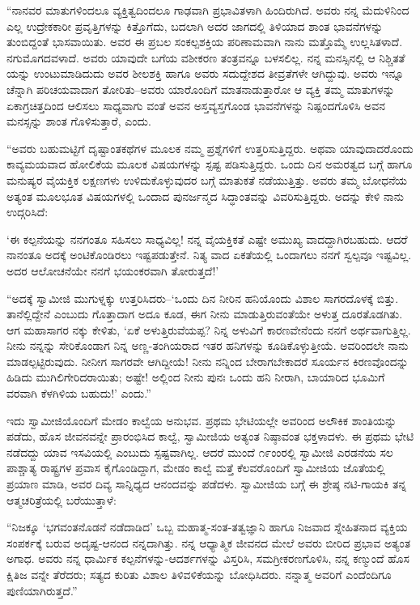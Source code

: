 “ನಾನವರ ಮಾತುಗಳಿಂದಲೂ ವ್ಯಕ್ತಿತ್ವದಿಂದಲೂ ಗಾಢವಾಗಿ ಪ್ರಭಾವಿತಳಾಗಿ ಹಿಂದಿರುಗಿದೆ. ಅವರು ನನ್ನ ಮೆದುಳಿನಿಂದ ಎಲ್ಲ ಉದ್ರೇಕಕಾರೀ ಪ್ರವೃತ್ತಿಗಳನ್ನು ಕಿತ್ತೊಗೆದು, ಬದಲಾಗಿ ಅದರ ಜಾಗದಲ್ಲಿ ತಿಳಿಯಾದ ಶಾಂತ ಭಾವನೆಗಳನ್ನು ತುಂಬಿದ್ದಂತೆ ಭಾಸವಾಯಿತು. ಅವರ ಈ ಪ್ರಬಲ ಸಂಕಲ್ಪಶಕ್ತಿಯ ಪರಿಣಾಮವಾಗಿ ನಾನು ಮತ್ತೊಮ್ಮೆ ಉಲ್ಲಸಿತಳಾದೆ. ನಗುಮೊಗದವಳಾದೆ. ಅವರು ಯಾವುದೇ ಬಗೆಯ ವಶೀಕರಣ ತಂತ್ರವನ್ನೂ ಬಳಸಲಿಲ್ಲ. ನನ್ನ ಮನಸ್ಸಿನಲ್ಲಿ ಆ ನಿಶ್ಚಿತತೆ ಯನ್ನು ಉಂಟುಮಾಡಿದುದು ಅವರ ಶೀಲಶಕ್ತಿ ಹಾಗೂ ಅವರು ಸದುದ್ದೇಶದ ತೀವ್ರತೆಗಳೇ ಆಗಿದ್ದುವು. ಅವರು ಇನ್ನೂ ಚೆನ್ನಾಗಿ ಪರಿಚಯವಾದಾಗ ತೋರಿತು–ಅವರು ಯಾರೊಂದಿಗೆ ಮಾತನಾಡುತ್ತಾರೋ ಆ ವ್ಯಕ್ತಿ ತಮ್ಮ ಮಾತುಗಳನ್ನು ಏಕಾಗ್ರಚಿತ್ತದಿಂದ ಆಲಿಸಲು ಸಾಧ್ಯವಾಗು ವಂತೆ ಅವನ ಅಸ್ತವ್ಯಸ್ತಗೊಂಡ ಭಾವನೆಗಳನ್ನು ನಿಷ್ಪಂದಗೊಳಿಸಿ ಅವನ ಮನಸ್ಸನ್ನು ಶಾಂತ ಗೊಳಿಸುತ್ತಾರೆ, ಎಂದು.

“ಅವರು ಬಹುಮಟ್ಟಿಗೆ ದೃಷ್ಟಾಂತಕಥೆಗಳ ಮೂಲಕ ನಮ್ಮ ಪ್ರಶ್ನೆಗಳಿಗೆ ಉತ್ತರಿಸುತ್ತಿದ್ದರು. ಅಥವಾ ಯಾವುದಾದರೊಂದು ಕಾವ್ಯಮಯವಾದ ಹೋಲಿಕೆಯ ಮೂಲಕ ವಿಷಯಗಳನ್ನು ಸ್ಪಷ್ಟ ಪಡಿಸುತ್ತಿದ್ದರು. ಒಂದು ದಿನ ಅಮರತ್ವದ ಬಗ್ಗೆ ಹಾಗೂ ಮನುಷ್ಯರ ವೈಯಕ್ತಿಕ ಲಕ್ಷಣಗಳು ಉಳಿದುಕೊಳ್ಳುವುದರ ಬಗ್ಗೆ ಮಾತುಕತೆ ನಡೆಯುತ್ತಿತ್ತು. ಅವರು ತಮ್ಮ ಬೋಧನೆಯ ಅತ್ಯಂತ ಮೂಲಭೂತ ವಿಷಯಗಳಲ್ಲಿ ಒಂದಾದ ಪುನರ್ಜನ್ಮದ ಸಿದ್ಧಾಂತವನ್ನು ವಿವರಿಸುತ್ತಿದ್ದರು. ಅದನ್ನು ಕೇಳಿ ನಾನು ಉದ್ಗರಿಸಿದೆ:

‘ಈ ಕಲ್ಪನೆಯನ್ನು ನನಗಂತೂ ಸಹಿಸಲು ಸಾಧ್ಯವಿಲ್ಲ! ನನ್ನ ವೈಯಕ್ತಿಕತೆ ಎಷ್ಟೇ ಅಮುಖ್ಯ ವಾದದ್ದಾಗಿರಬಹುದು. ಆದರೆ ನಾನಂತೂ ಅದಕ್ಕೆ ಅಂಟಿಕೊಂಡಿರಲು ಇಷ್ಟಪಡುತ್ತೇನೆ. ನಿತ್ಯ ವಾದ ಏಕತೆಯಲ್ಲಿ ಒಂದಾಗಲು ನನಗೆ ಸ್ವಲ್ಪವೂ ಇಷ್ಟವಿಲ್ಲ. ಅದರ ಆಲೋಚನೆಯೇ ನನಗೆ ಭಯಂಕರವಾಗಿ ತೋರುತ್ತದೆ!’

“ಅದಕ್ಕೆ ಸ್ವಾಮೀಜಿ ಮುಗುಳ್ನಕ್ಕು ಉತ್ತರಿಸಿದರು–‘ಒಂದು ದಿನ ನೀರಿನ ಹನಿಯೊಂದು ವಿಶಾಲ ಸಾಗರದೊಳಕ್ಕೆ ಬಿತ್ತು. ತಾನೆಲ್ಲಿದ್ದೇನೆ ಎಂಬುದು ಗೊತ್ತಾದಾಗ ಅದೂ ಕೂಡ, ಈಗ ನೀನು ಮಾಡುತ್ತಿರುವಂತೆಯೇ ಅಳುತ್ತ ದೂರತೊಡಗಿತು. ಆಗ ಮಹಾಸಾಗರ ನಕ್ಕು ಕೇಳಿತು, ‘ಏಕೆ ಅಳುತ್ತಿರುವೆಯಪ್ಪ? ನಿನ್ನ ಅಳುವಿಗೆ ಕಾರಣವೇನೆಂದು ನನಗೆ ಅರ್ಥವಾಗುತ್ತಿಲ್ಲ. ನೀನು ನನ್ನನ್ನು ಸೇರಿಕೊಂಡಾಗ ನಿನ್ನ ಅಣ್ಣ-ತಂಗಿಯರಾದ ಇತರ ಹನಿಗಳನ್ನು ಕೂಡಿಕೊಳ್ಳುತ್ತೀಯೆ. ಅವರಿಂದಲೇ ನಾನು ಮಾಡಲ್ಪಟ್ಟಿರುವುದು. ನೀನೀಗ ಸಾಗರವೇ ಆಗಿದ್ದೀಯೆ! ನೀನು ನನ್ನಿಂದ ಬೇರಾಗಬೇಕಾದರೆ ಸೂರ್ಯನ ಕಿರಣವೊಂದನ್ನು ಹಿಡಿದು ಮುಗಿಲಿಗೇರಿದರಾಯಿತು; ಅಷ್ಟೇ! ಅಲ್ಲಿಂದ ನೀನು ಪುನಃ ಒಂದು ಹನಿ ನೀರಾಗಿ, ಬಾಯಾರಿದ ಭೂಮಿಗೆ ವರವಾಗಿ ಕೆಳಗಿಳಿಯ ಬಹುದು!’ ಎಂದು.”

ಇದು ಸ್ವಾಮೀಜಿಯೊಂದಿಗೆ ಮೇಡಂ ಕಾಲ್ವೆಯ ಅನುಭವ. ಪ್ರಥಮ ಭೇಟಿಯಲ್ಲೇ ಅವರಿಂದ ಅಲೌಕಿಕ ಶಾಂತಿಯನ್ನು ಪಡೆದು, ಹೊಸ ಜೀವನವನ್ನೇ ಪ್ರಾರಂಭಿಸಿದ ಕಾಲ್ವೆ, ಸ್ವಾಮೀಜಿಯ ಅತ್ಯಂತ ನಿಷ್ಠಾವಂತ ಭಕ್ತಳಾದಳು. ಈ ಪ್ರಥಮ ಭೇಟಿ ನಡೆದದ್ದು ಯಾವ ಇಸವಿಯಲ್ಲಿ ಎಂಬುದು ಸ್ಪಷ್ಟವಾಗಿಲ್ಲ. ಆದರೆ ಮುಂದೆ ೧೯ಂಂರಲ್ಲಿ ಸ್ವಾಮೀಜಿ ಎರಡನೆಯ ಸಲ ಪಾಶ್ಚಾತ್ಯ ರಾಷ್ಟ್ರಗಳ ಪ್ರವಾಸ ಕೈಗೊಂಡಿದ್ದಾಗ, ಮೇಡಂ ಕಾಲ್ವೆ ಮತ್ತೆ ಕೆಲವರೊಂದಿಗೆ ಸ್ವಾಮೀಜಿಯ ಜೊತೆಯಲ್ಲಿ ಪ್ರಯಾಣ ಮಾಡಿ, ಅವರ ದಿವ್ಯ ಸಾನ್ನಿಧ್ಯದ ಆನಂದವನ್ನು ಪಡೆದಳು. ಸ್ವಾಮೀಜಿಯ ಬಗ್ಗೆ ಈ ಶ್ರೇಷ್ಠ ನಟಿ-ಗಾಯಕಿ ತನ್ನ ಆತ್ಮಚರಿತ್ರೆಯಲ್ಲಿ ಬರೆಯುತ್ತಾಳೆ:

“ನಿಜಕ್ಕೂ ‘ಭಗವಂತನೊಡನೆ ನಡೆದಾಡಿದ’ ಒಬ್ಬ ಮಹಾತ್ಮ-ಸಂತ-ತತ್ವಜ್ಞಾನಿ ಹಾಗೂ ನಿಜವಾದ ಸ್ನೇಹಿತನಾದ ವ್ಯಕ್ತಿಯ ಸಂಪರ್ಕಕ್ಕೆ ಬರುವ ಅದೃಷ್ಟ-ಆನಂದ ನನ್ನದಾಗಿತ್ತು. ನನ್ನ ಆಧ್ಯಾತ್ಮಿಕ ಜೀವನದ ಮೇಲೆ ಅವರು ಬೀರಿದ ಪ್ರಭಾವ ಅತ್ಯಂತ ಅಗಾಧ. ಅವರು ನನ್ನ ಧಾರ್ಮಿಕ ಕಲ್ಪನೆಗಳನ್ನು-ಆದರ್ಶಗಳನ್ನು ವಿಸ್ತರಿಸಿ, ಸಮಗ್ರೀಕರಣಗೊಳಿಸಿ, ನನ್ನ ಕಣ್ಮುಂದೆ ಹೊಸ ಕ್ಷಿತಿಜ ವನ್ನೇ ತೆರೆದರು; ಸತ್ಯದ ಕುರಿತು ವಿಶಾಲ ತಿಳಿವಳಿಕೆಯನ್ನು ಬೋಧಿಸಿದರು. ನನ್ನಾತ್ಮ ಅವರಿಗೆ ಎಂದೆಂದಿಗೂ ಪುಣಿಯಾಗಿರುತ್ತದೆ.”

